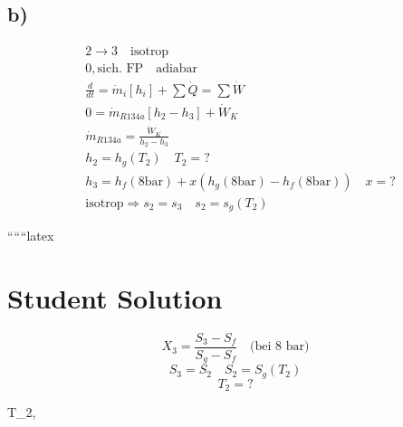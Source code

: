 

\subsection*{b)}

\begin{align*}
    &2 \rightarrow 3 \quad \text{isotrop} \\
    &0, \text{sich. FP} \quad \text{adiabar} \\
    &\frac{d}{dt} = \dot{m}_i [h_i] + \sum \dot{Q} = \sum \dot{W} \\
    &0 = \dot{m}_{R134a} [h_2 - h_3] + \dot{W}_K \\
    &\dot{m}_{R134a} = \frac{\dot{W}_K}{h_2 - h_3} \\
    &h_2 = h_g(T_2) \quad T_2 = ? \\
    &h_3 = h_f(8 \text{bar}) + x (h_g(8 \text{bar}) - h_f(8 \text{bar})) \quad x = ? \\
    &\text{isotrop} \Rightarrow s_2 = s_3 \quad s_2 = s_g(T_2)
\end{align*}

``````latex


\section*{Student Solution}

\[
X_3 = \frac{S_3 - S_f}{S_g - S_f} \quad \text{(bei 8 bar)}
\]
\[
S_3 = S_2 \quad S_2 = S_g(T_2)
\]
\[
T_2 = ?
\]

 T_2, 